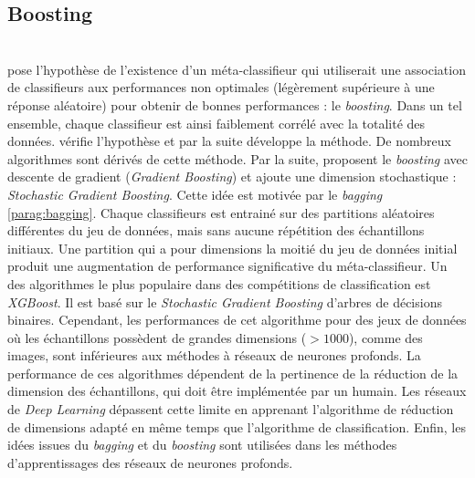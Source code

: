 \subsection{Boosting}\mbox{\label{parag:boosting}} \\
\citeauthor{kearns_thoughts_1988} \cite{kearns_thoughts_1988} pose l'hypothèse de l'existence d'un méta-classifieur qui utiliserait une association de classifieurs aux performances non optimales (légèrement supérieure à une réponse aléatoire) pour obtenir de bonnes performances : le \textit{boosting}.
Dans un tel ensemble, chaque classifieur est ainsi faiblement corrélé avec la totalité des données.
\citeauthor{schapire_strength_1990} \cite{schapire_strength_1990} vérifie l'hypothèse et par la suite \citeauthor{breiman_bias_1996} \cite{breiman_bias_1996, breiman_arcing_1997} développe la méthode.
De nombreux algorithmes sont dérivés de cette méthode.
Par la suite, \citeauthor{mason_boosting_1999, friedman_greedy_2001} \cite{mason_boosting_1999, friedman_greedy_2001} proposent le \textit{boosting} avec descente de gradient (\textit{Gradient Boosting}) et \citeauthor{friedman_stochastic_2002} \cite{friedman_stochastic_2002} ajoute une dimension stochastique : \textit{Stochastic Gradient Boosting}.
Cette idée est motivée par le \textit{bagging} \ref{parag:bagging}.
Chaque classifieurs est entrainé sur des partitions aléatoires différentes du jeu de données, mais sans aucune répétition des échantillons initiaux.
Une partition qui a pour dimensions la moitié du jeu de données initial produit une augmentation de performance significative du méta-classifieur.
Un des algorithmes le plus populaire dans des compétitions de classification est \textit{XGBoost}.
Il est basé sur le \textit{Stochastic Gradient Boosting} d'arbres de décisions binaires.
Cependant, les performances de cet algorithme pour des jeux de données où les échantillons possèdent de grandes dimensions ($> 1000$), comme des images, sont inférieures aux méthodes à réseaux de neurones profonds.
La performance de ces algorithmes dépendent de la pertinence de la réduction de la dimension des échantillons, qui doit être implémentée par un humain.
Les réseaux de \textit{Deep Learning} dépassent cette limite en apprenant l'algorithme de réduction de dimensions adapté en même temps que l'algorithme de classification.
Enfin, les idées issues du \textit{bagging} et du \textit{boosting} sont utilisées dans les méthodes d'apprentissages des réseaux de neurones profonds.

